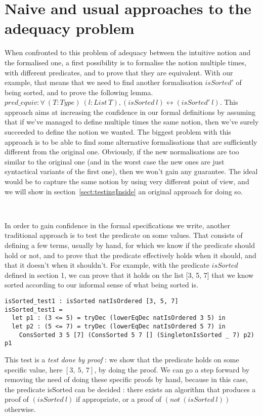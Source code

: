\section{Naive and usual approaches to the adequacy problem}

\label{sect:naiveApproaches}


When confronted to this problem of adequacy between the intuitive notion and the formalised one, a first possibility is to formalise the notion multiple times, with different predicates, and to prove that they are equivalent.
With our example, that means that we need to find another formalisation $isSorted'$ of being sorted, and to prove the following lemma.
$pred\_equiv : \forall\ (T:Type)\ (l:List\ T), (isSorted\ l) \leftrightarrow (isSorted'\ l)$.
This approach aims at increasing the confidence in our formal definitions by assuming that if we've managed to define multiple times the same notion, then we've surely succeeded to define the notion we wanted. The biggest problem with this approach is to be able to find some alternative formalisations that are sufficiently different from the original one. Obviously, if the new normalisations are too similar to the original one (and in the worst case the new ones are just syntactical variants of the first one), then we won't gain any guarantee. The ideal would be to capture the same notion by using very different point of view, and we will show in section~\ref{sect:testingInside} an original approach for doing so.

\

In order to gain confidence in the formal specifications we write, another traditional approach is to test the predicate on some values. That consists of defining a few terms, usually by hand, for which we know if the predicate should hold or not, and to prove that the predicate effectively holds when it should, and that it doesn't when it shouldn't. For example, with the predicate $isSorted$ defined in section 1, we can prove that it holds on the list [3, 5, 7] that we know sorted according to our informal sense of what being sorted is.

\begin{lstlisting}
isSorted_test1 : isSorted natIsOrdered [3, 5, 7]
isSorted_test1 = 
  let p1 : (3 <= 5) = tryDec (lowerEqDec natIsOrdered 3 5) in
  let p2 : (5 <= 7) = tryDec (lowerEqDec natIsOrdered 5 7) in
    ConsSorted 3 5 [7] (ConsSorted 5 7 [] (SingletonIsSorted _ 7) p2) p1
\end{lstlisting}
This test is a \emph{test done by proof} : we show that the predicate holds on some specific value, here $[3,\ 5,\ 7]$, by doing the proof. We can go a step forward by removing the need of doing these specific proofs by hand, because in this case, the predicate isSorted can be decided : there exists an algorithm that produces a proof of $(isSorted\ l)$ if appropriate, or a proof of $(not\ (isSorted\ l))$ otherwise.

